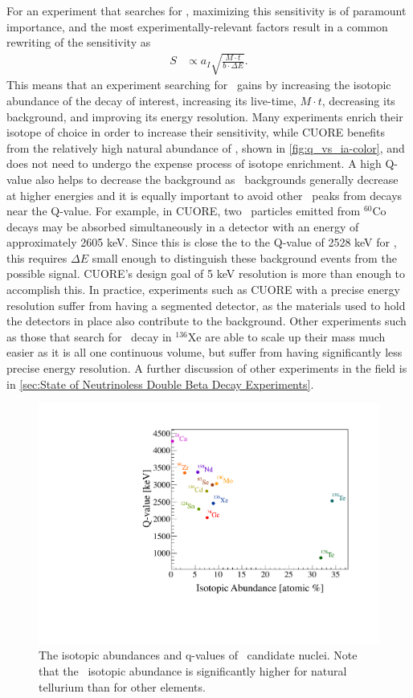 For an experiment that searches for \zeronubb, maximizing this sensitivity is of paramount importance, and the most experimentally-relevant factors result in a common rewriting of the sensitivity as
\begin{align}
S &\propto a_I \sqrt{\frac{M \cdot t}{b \cdot \Delta E}}.
\label{eq:sensitivity_short}
\end{align}
This means that an experiment searching for \zeronubb~gains by increasing the isotopic abundance of the decay of interest, increasing its live-time, $M\cdot t$, decreasing its background, and improving its energy resolution. Many experiments enrich their isotope of choice in order to increase their sensitivity, while CUORE benefits from the relatively high natural abundance of \teonethirty, shown in \autoref{fig:q_vs_ia-color}, and does not need to undergo the expense process of isotope enrichment. A high Q-value also helps to decrease the background as \gamma~backgrounds generally decrease at higher energies and it is equally important to avoid other \gamma~peaks from decays near the Q-value. For example, in CUORE, two \gamma~particles emitted from $^{60}\textrm{Co}$ decays may be absorbed simultaneously in a detector with an energy of approximately 2605 keV. Since this is close the to the Q-value of 2528 keV for \teonethirty, this requires $\Delta E$ small enough to distinguish these background events from the possible signal. CUORE's design goal of 5 keV resolution is more than enough to accomplish this. In practice, experiments such as CUORE with a precise energy resolution suffer from having a segmented detector, as the materials used to hold the detectors in place also contribute to the background. Other experiments such as those that search for \zeronubb~decay in $^{136}$Xe are able to scale up their mass much easier as it is all one continuous volume, but suffer from having significantly less precise energy resolution. A further discussion of other experiments in the field is in \autoref{sec:State of Neutrinoless Double Beta Decay Experiments}.

\begin{figure}[htbp]
    \centering
    \includegraphics[width=0.7\linewidth]{Figures/q_vs_ia-color.pdf}
    \caption[The isotopic abundances and q-values of \zeronubb~candidate nuclei.]{The isotopic abundances and q-values of \zeronubb~candidate nuclei. Note that the \teonethirty~isotopic abundance is significantly higher for natural tellurium than for other elements.}
    \label{fig:q_vs_ia-color}
\end{figure}

